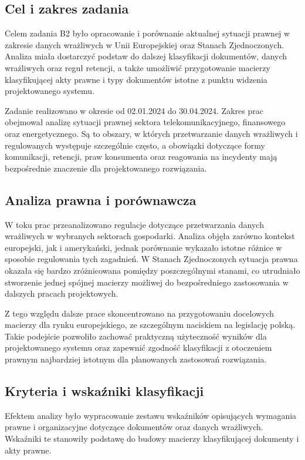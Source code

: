 \documentclass[12pt,a4paper]{report}
\begin{document}
\subsection{Cel i zakres zadania}
Celem zadania B2 było opracowanie i porównanie aktualnej sytuacji prawnej w zakresie danych wrażliwych w Unii Europejskiej oraz Stanach Zjednoczonych. Analiza miała dostarczyć podstaw do dalszej klasyfikacji dokumentów, danych wrażliwych oraz reguł retencji, a także umożliwić przygotowanie macierzy klasyfikującej akty prawne i typy dokumentów istotne z punktu widzenia projektowanego systemu.

Zadanie realizowano w okresie od 02.01.2024 do 30.04.2024. Zakres prac obejmował analizę sytuacji prawnej sektora telekomunikacyjnego, finansowego oraz energetycznego. Są to obszary, w których przetwarzanie danych wrażliwych i regulowanych występuje szczególnie często, a obowiązki dotyczące formy komunikacji, retencji, praw konsumenta oraz reagowania na incydenty mają bezpośrednie znaczenie dla projektowanego rozwiązania.

\subsection{Analiza prawna i porównawcza}
W toku prac przeanalizowano regulacje dotyczące przetwarzania danych wrażliwych w wybranych sektorach gospodarki. Analiza objęła zarówno kontekst europejski, jak i amerykański, jednak porównanie wykazało istotne różnice w sposobie regulowania tych zagadnień. W Stanach Zjednoczonych sytuacja prawna okazała się bardzo zróżnicowana pomiędzy poszczególnymi stanami, co utrudniało stworzenie jednej spójnej macierzy możliwej do bezpośredniego zastosowania w dalszych pracach projektowych.

Z tego względu dalsze prace skoncentrowano na przygotowaniu docelowych macierzy dla rynku europejskiego, ze szczególnym naciskiem na legislację polską. Takie podejście pozwoliło zachować praktyczną użyteczność wyników dla projektowanego systemu oraz zapewnić zgodność klasyfikacji z otoczeniem prawnym najbardziej istotnym dla planowanych zastosowań rozwiązania.

\subsection{Kryteria i wskaźniki klasyfikacji}
Efektem analizy było wypracowanie zestawu wskaźników opisujących wymagania prawne i organizacyjne dotyczące dokumentów oraz danych wrażliwych. Wskaźniki te stanowiły podstawę do budowy macierzy klasyfikującej dokumenty i akty prawne.
\end{document}

